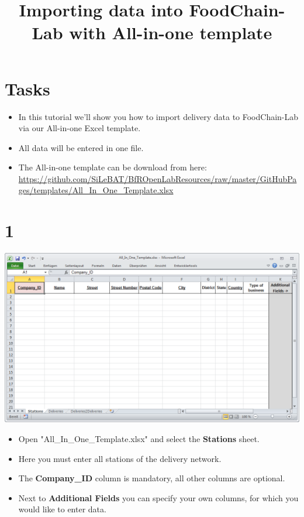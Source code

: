 \documentclass{beamer}
\title{Importing data into FoodChain-Lab with All-in-one template}
\date{}
\begin{document}
\maketitle

\section{Tasks}
\begin{frame}
	\begin{itemize}
		\item In this tutorial we'll show you how to import delivery data to FoodChain-Lab via our All-in-one Excel template.
		\item All data will be entered in one file.
		\item The All-in-one template can be download from here: \url{https://github.com/SiLeBAT/BfROpenLabResources/raw/master/GitHubPages/templates/All_In_One_Template.xlsx}
	\end{itemize}
\end{frame}
 
\section{1}
\begin{frame}
	\begin{center}
  		\includegraphics[height=0.5\textheight]{1.png}
	\end{center}
	\begin{itemize}
		\item Open "All\_In\_One\_Template.xlsx" and select the \textbf{Stations} sheet.
		\item Here you must enter all stations of the delivery network.
		\item The \textbf{Company\_ID} column is mandatory, all other columns are optional.
		\item Next to \textbf{Additional Fields} you can specify your own columns, for which you would like to enter data.
	\end{itemize}
\end{frame}
\end{document}
